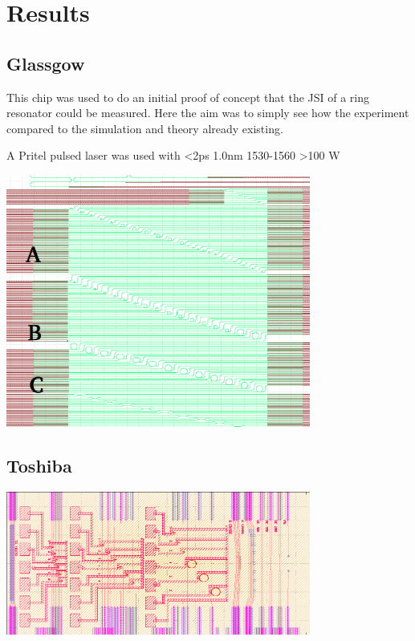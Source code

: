 \newpage
\section{Results}

\subsection{Glassgow}



This chip was used to do an initial proof of concept that the JSI of a ring resonator could be measured. Here the aim was to simply see how the experiment compared to the simulation and theory already existing.

A Pritel pulsed laser was used with <2ps 1.0nm 1530-1560 >100 W


\begingroup
    \centering  
    \includegraphics[width=10cm]{img/results/glassgowChipNumbering.png}
     \vspace{3pt} \label{crossCompare}
\endgroup


\subsection{Toshiba}
\begingroup
    \centering  
    \includegraphics[width=10cm]{img/results/toshiba.png}
     \vspace{3pt} \label{crossCompare}
\endgroup


